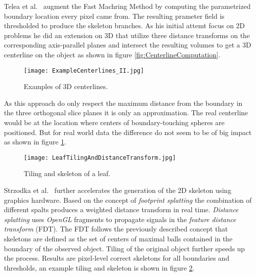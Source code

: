 Telea et al.~\cite{alexandru2002augmented} augment the Fast Machring Method by computing the parametrized boundary location every pixel came from. The resulting prameter field is thresholded to produce the skeleton branches.
As his initial attemt focus on 2D problems he did an extension on 3D that utilize three distance transforms on the corresponding axis-parallel planes and intersect the resulting volumes to get a 3D centerline on the object as shown in figure \ref{fig:CenterlineComputation}.

\begin{figure}[h]
	\centering
	\texttt{[image: ExampleCenterlines\_II.jpg]} \\
	\caption{Examples of 3D centerlines.}
	\cite{alexandru2002augmented}
	\label{fig:ExampleCenterlines_II}
\end{figure} 

As this approach do only respect the maximum distance from the boundary in the three orthogonal slice planes it is only an approximation. The real centerline would be at the location where centers of boundary-touching spheres are positioned. But for real world data the difference do not seem to be of big impact as shown in figure \ref{fig:ExampleCenterlines_II}. 

\begin{figure}[h]
	\centering
	\texttt{[image: LeafTilingAndDistanceTransform.jpg]} \\
	\caption{Tiling and skeleton of a leaf.}
	\cite{strzodka2004generalized}
	\label{fig:LeafTilingAndDistanceTransform}
\end{figure} 

Strzodka et al.~\cite{strzodka2004generalized} further accelerates the generation of the 2D skeleton using graphics hardware. Based on the concept of \emph{footprint splatting} the combination of different spalts produces a weighted distance transform in real time. \emph{Distance splatting} uses \emph{OpenGL} fragments to propagate signals in the \emph{feature distance transform} (FDT). The FDT follows the previously described concept that skeletons are defined as the set of centers of maximal balls contained in the boundary of the observed object. Tiling of the original object further speeds up the process. Results are pixel-level correct skeletons for all boundaries and thresholds, an example tiling and skeleton is shown in figure \ref{fig:LeafTilingAndDistanceTransform}.


